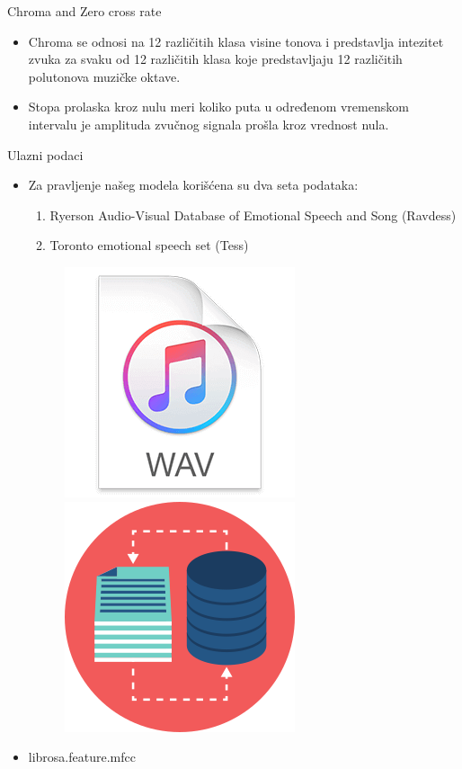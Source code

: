 \documentclass{beamer}
\begin{document}
\begin{frame}{Chroma and Zero cross rate}
\begin{itemize}
    \item Chroma se odnosi na 12 različitih klasa visine tonova i predstavlja intezitet zvuka za svaku od 12 različitih klasa koje predstavljaju 12 različitih polutonova muzičke oktave. 
    \item Stopa prolaska kroz nulu meri koliko puta u određenom vremenskom intervalu je amplituda zvučnog signala prošla kroz vrednost nula.
\end{itemize}
\end{frame}

\begin{frame}{Ulazni podaci}
\begin{itemize}
    \item Za pravljenje našeg modela korišćena su dva seta podataka: 
    \begin{enumerate}
    \item Ryerson Audio-Visual Database of Emotional Speech and Song (Ravdess)
    \item Toronto emotional speech set (Tess)
    \end{enumerate}
    \begin{figure}[h]
    \centering
    \includegraphics[scale=0.4]{im3.png}
    \includegraphics[scale=0.2]{im2.png}
    \end{figure}
    \item librosa.feature.mfcc
\end{itemize}
\end{frame}
\end{document}
